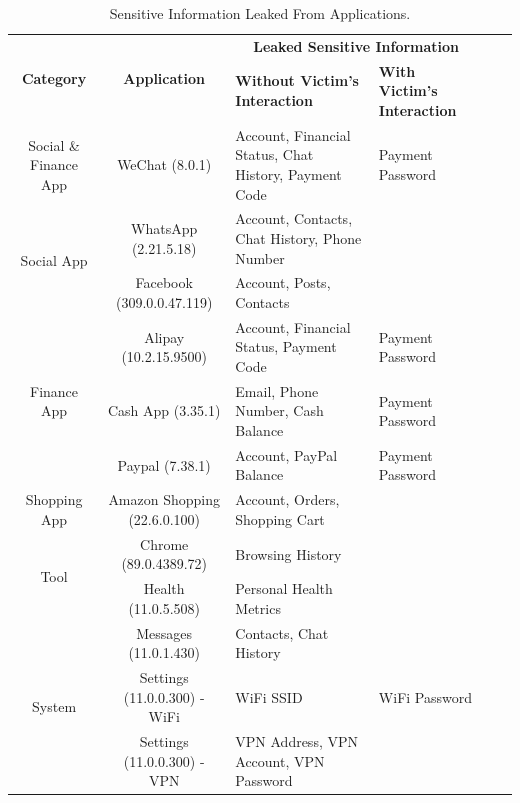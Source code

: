 \begin{table}[t]
	\centering
	\begin{tabular}{|c|c|l|l|c|c|}
		\hline
		\multirow{2}{*}{\textbf{Category} } & \multirow{2}{*}{ \textbf{Application} } & \multicolumn{2}{c|}{\textbf{Leaked Sensitive Information}} \\
															\cline{3-4}
											&				& \textbf{Without Victim's Interaction}						& \textbf{With Victim's Interaction} \\
		\hline
		Social \& Finance App 				& WeChat (8.0.1)      & Account, Financial Status, Chat History, Payment Code   		& Payment Password \\
		\hline
		\multirow{2}{*}{Social App}
							       			& WhatsApp (2.21.5.18)    & Account, Contacts, Chat History, Phone Number    & \\
											\cline{2-4}
							       			& Facebook (309.0.0.47.119)   & Account, Posts, Contacts           & \\
		\hline
		\multirow{3}{*}{Finance App}       	& Alipay (10.2.15.9500)      & Account, Financial Status, Payment Code         				& Payment Password \\
											\cline{2-4}
											& Cash App (3.35.1)   & Email, Phone Number, Cash Balance							& Payment Password \\
											\cline{2-4}
											& Paypal (7.38.1)      & Account, PayPal Balance     								& Payment Password \\
		\hline
		\multirow{1}{*}{Shopping App}		& Amazon Shopping (22.6.0.100)  & Account, Orders, Shopping Cart         				& \\
		\hline
		\multirow{2}{*}{Tool}               & Chrome (89.0.4389.72)      & Browsing History                                	& \\
											\cline{2-4}
		                					& Health (11.0.5.508)      & Personal Health Metrics      						& \\
		\hline
		\multirow{3}{*}{System}             &  Messages (11.0.1.430)   & Contacts, Chat History				 &   \\
											\cline{2-4}
											& Settings (11.0.0.300) - WiFi   & WiFi SSID                                	&  WiFi Password \\
											\cline{2-4}
		                					& Settings (11.0.0.300) - VPN    & VPN Address, VPN Account, VPN Password      						& \\
		\hline
	\end{tabular}
	\linebreak
	\caption{Sensitive Information Leaked From Applications.}
	\label{table:information_extracted}
\end{table}


